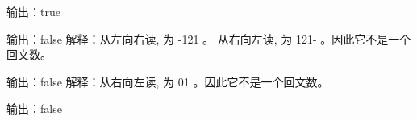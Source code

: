 输出：true

输出：false
解释：从左向右读, 为 -121 。 从右向左读, 为 121- 。因此它不是一个回文数。

输出：false
解释：从右向左读, 为 01 。因此它不是一个回文数。

输出：false
